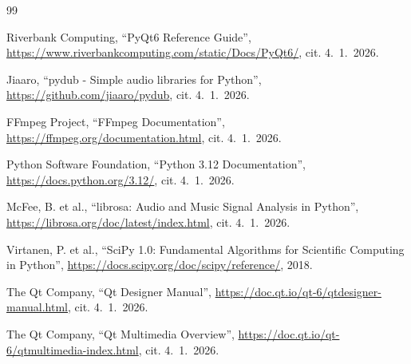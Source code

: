 \documentclass[12pt, a4paper,
]{report}
\begin{document}
\begin{thebibliography}{99}

Riverbank Computing, ``PyQt6 Reference Guide'', 
\url{https://www.riverbankcomputing.com/static/Docs/PyQt6/}, 
cit. 4.~1.~2026.

Jiaaro, ``pydub - Simple audio libraries for Python'', 
\url{https://github.com/jiaaro/pydub}, 
cit. 4.~1.~2026.

FFmpeg Project, ``FFmpeg Documentation'', 
\url{https://ffmpeg.org/documentation.html}, 
cit. 4.~1.~2026.

Python Software Foundation, ``Python 3.12 Documentation'', 
\url{https://docs.python.org/3.12/}, 
cit. 4.~1.~2026.

McFee, B. et al., ``librosa: Audio and Music Signal Analysis in Python'', 
\url{https://librosa.org/doc/latest/index.html}, 
cit. 4.~1.~2026.

Virtanen, P. et al., ``SciPy 1.0: Fundamental Algorithms for Scientific Computing in Python'', 
\url{https://docs.scipy.org/doc/scipy/reference/}, 
2018.

The Qt Company, ``Qt Designer Manual'', 
\url{https://doc.qt.io/qt-6/qtdesigner-manual.html}, 
cit. 4.~1.~2026.

The Qt Company, ``Qt Multimedia Overview'', 
\url{https://doc.qt.io/qt-6/qtmultimedia-index.html}, 
cit. 4.~1.~2026.

\end{thebibliography}
\end{document}
